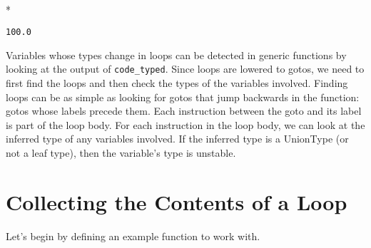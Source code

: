 \documentclass[letterpaper,10pt,english]{/usr/share/sphinx/texinputs/sphinxhowto}
\def\smaller{\fontsize{9.5pt}{9.5pt}\selectfont}
\newenvironment{InvisibleVerbatim}
        {\begin{mdframed}[leftmargin=0.1\linewidth,innerleftmargin=3pt,innerrightmargin=3pt, userdefinedwidth=1\linewidth, linewidth=0pt, linecolor=white, usetwoside=false]}
        {\end{mdframed}}
\begin{document}
    

        
        

            
                \makebox[0.1\linewidth]{\smaller\hfill\tt\color{nbframe-out-prompt}Out\hspace{4pt}{[}27{]}:\hspace{4pt}}\\*
                \vspace{-2.55\baselineskip}\begin{InvisibleVerbatim}
                \vspace{-0.5\baselineskip}
\begin{alltt}100.0\end{alltt}

            \end{InvisibleVerbatim}
            
        
    
Variables whose types change in loops can be detected in generic
functions by looking at the output of \texttt{code\_typed}. Since loops
are lowered to gotos, we need to first find the loops and then check the
types of the variables involved. Finding loops can be as simple as
looking for gotos that jump backwards in the function: gotos whose
labels precede them. Each instruction between the goto and its label is
part of the loop body. For each instruction in the loop body, we can
look at the inferred type of any variables involved. If the inferred
type is a UnionType (or not a leaf type), then the variable's type is
unstable.\section{Collecting the Contents of a Loop}Let's begin by defining an example function to work with.

\end{document}
